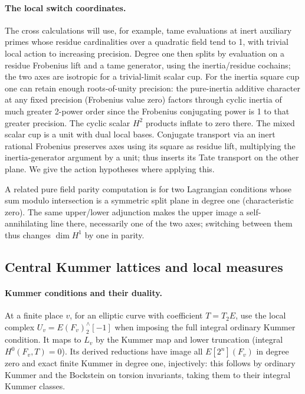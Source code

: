\paragraph{The local switch coordinates.}
The cross calculations will use, for example, tame evaluations at inert auxiliary primes whose residue cardinalities over a quadratic field tend to 1, with trivial local action to increasing precision. Degree one then splits by evaluation on a residue Frobenius lift and a tame generator, using the inertia/residue cochains; the two axes are isotropic for a trivial-limit scalar cup. For the inertia square cup one can retain enough roots-of-unity precision: the pure-inertia additive character at any fixed precision (Frobenius value zero) factors through cyclic inertia of much greater 2-power order since the Frobenius conjugating power is 1 to that greater precision. The cyclic scalar \(H^2\) products inflate to zero there. The mixed scalar cup is a unit with dual local bases. Conjugate transport via an inert rational Frobenius preserves axes using its square as residue lift, multiplying the inertia-generator argument by a unit; thus inserts its Tate transport on the other plane. We give the action hypotheses where applying this. 

A related pure field parity computation is for two Lagrangian conditions whose sum modulo intersection is a symmetric split plane in degree one (characteristic zero). The same upper/lower adjunction makes the upper image a self-annihilating line there, necessarily one of the two axes; switching between them thus changes \(\dim H^1\) by one in parity.

\subsection{Central Kummer lattices and local measures}

\paragraph{Kummer conditions and their duality.}
At a finite place \(v\), for an elliptic curve with coefficient \(T=T_2E\), use the local complex \(U_v=E(F_v)^\wedge_2[-1]\) when imposing the full integral ordinary Kummer condition. It maps to \(L_v\) by the Kummer map and lower truncation (integral \(H^0(F_v,T)=0\)). Its derived reductions have image all \(E[2^n](F_v)\) in degree zero and exact finite Kummer in degree one, injectively: this follows by ordinary Kummer and the Bockstein on torsion invariants, taking them to their integral Kummer classes. 

